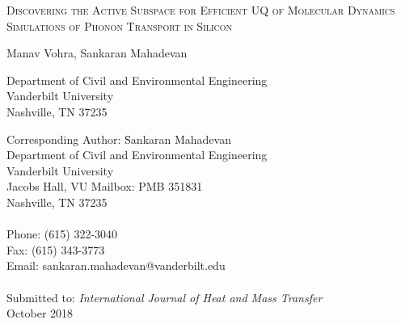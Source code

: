 \begin{center}
\textsc{
Discovering the Active Subspace for Efficient UQ of
Molecular Dynamics Simulations of Phonon Transport in Silicon
}

\bigskip 
\bigskip 

Manav Vohra, Sankaran Mahadevan

\bigskip
\bigskip

\normalsize
Department of Civil and Environmental Engineering\\
Vanderbilt University\\
Nashville, TN 37235\\

\end{center}

\vspace{6cm}

\begin{tabbing}
Corresponding Author: \hspace{5mm} \= Sankaran Mahadevan\\
       \>  Department of Civil and Environmental Engineering\\
       \>  Vanderbilt University\\
        Jacobs Hall, VU Mailbox: PMB 351831 \\
       \>  Nashville, TN 37235 \\
       \> \\
Phone: \> (615) 322-3040 \\
Fax:   \> (615) 343-3773 \\
Email: \>  sankaran.mahadevan@vanderbilt.edu   \\
\\
Submitted to: \> \textit{International Journal of Heat and Mass Transfer} \\
\>  October 2018\\

\bigskip
\end{tabbing}

\clearpage

